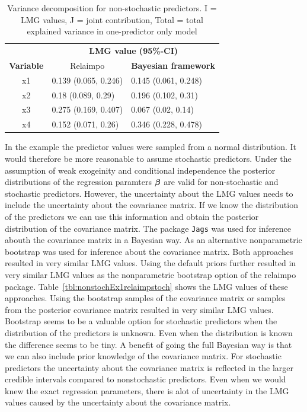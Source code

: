 \documentclass[11pt,a4paper,twoside]{book}
\begin{document}
\begin{table}[h]
\caption{Variance decomposition for non-stochastic predictors. I = LMG values, J = joint contribution, Total = total explained variance in one-predictor only model}
\centering
\begin{tabular}{cll}
   \toprule
   &\multicolumn{2}{c}{\textbf{LMG value (95\%-CI)}} \\
 \textbf{Variable} & \multicolumn{1}{c}{Relaimpo} & \textbf{Bayesian framework}  \\
  \hline
x1 & 0.139 (0.065, 0.246)  & 0.145 (0.061, 0.248)  \\ 
x2 & 0.18 (0.089, 0.29)  & 0.196 (0.102, 0.31)   \\ 
x3 & 0.275 (0.169, 0.407)  & 0.067 (0.02, 0.14)  \\ 
x4 & 0.152 (0.071, 0.26) & 0.346 (0.228, 0.478)  \\ 
   \bottomrule
\end{tabular}
\label{tbl:nonstochEx1relamip}
\end{table}

\FloatBarrier


In the example the predictor values were sampled from a normal distribution. It would therefore be more reasonable to assume stochastic predictors. Under the assumption of weak exogeinity and conditional independence the posterior distributions of the regression paramters ${\boldsymbol{\beta}}$ are valid for non-stochastic and stochastic predictors. However, the uncertainty about the LMG values needs to include the uncertainty about the covariance matrix. If we know the distribution of the predictors we can use this information and obtain the posterior distribution of the covariance matrix. The package \texttt{Jags} was used for inference abouth the covariance matrix in a Bayesian way. As an alternative nonparametric bootstrap was used for inference about the covariance matrix. Both approaches resulted in very similar LMG values. Using the default priors further resulted in very similar LMG values as the nonparametric bootstrap option of the relaimpo package. Table~\ref{tbl:nonstochEx1relaimpstoch} shows the LMG values of these approaches. Using the bootstrap samples of the covariance matrix or samples from the posterior covariance matrix resulted in very similar LMG values. Bootstrap seems to be a valuable option for stochastic predictors when the distribution of the predictors is unknown. Even when the distribution is known the difference seems to be tiny. A benefit of going the full Bayesian way is that we can also include prior knowledge of the covariance matrix. For stochastic predictors the uncertainty about the covariance matrix is reflected in the larger credible intervals compared to nonstochastic predictors. Even when we would knew the exact regression parameters, there is alot of uncertainty in the LMG values caused by the uncertainty about the covariance matrix. 
\end{document}

